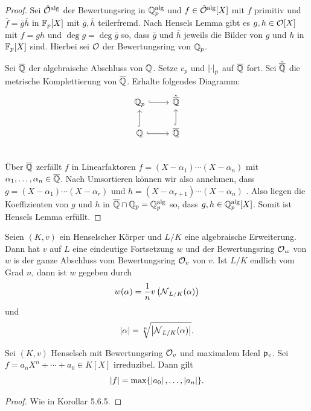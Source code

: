 \begin{proof}
	Sei $\hat{\mathcal{O}}^{\operatorname{alg}}$ der Bewertungsring in $\mathbb{Q}_p^{\operatorname{alg}}$ und $f\in\hat{\mathcal{O}}^{\operatorname{alg}}[X]$
	mit $f$ primitiv und $\overline{f} = \overline{g} \overline{h}$ in $\mathbb{F}_p[X]$ mit $\overline{g}, \overline{h}$ teilerfremd.
	Nach Hensels Lemma gibt es $g,h \in \mathcal{O}[X]$ mit $f=gh$ und $\deg g = \deg \overline{g}$ so, dass $\overline{g}$ und $\overline{h}$ jeweils die Bilder von $g$ und $h$ in $\mathbb{F}_p[X]$ sind. Hierbei sei $\mathcal{O}$ der Bewertungsring von $\mathbb{Q}_p$.
	
	\bigskip Sei $\overline{\mathbb{Q}}$ der algebraische Abschluss von $\mathbb{Q}$. Setze $v_p$ und $\left|{\cdot}\right|_p$ auf $\overline{\mathbb{Q}}$ fort. Sei $\hat{\overline{\mathbb{Q}}}$ die metrische Komplettierung von $\overline{\mathbb{Q}}$. Erhalte folgendes Diagramm:
	\[ \begin{tikzcd}
	\Q_p
	\arrow[hookrightarrow]{r}
	& \hat{\overline{\Q}}
	\\
	\Q
	\arrow[hookrightarrow]{r}
	\arrow[hookrightarrow]{u}
	&\overline{\Q}
	\arrow[hookrightarrow]{u}
	\\
	\end{tikzcd}
	\]
Über $\overline{\mathbb{Q}}$ zerfällt $f$ in Linearfaktoren $f=(X-\alpha_1) \cdots (X-\alpha_n)$ mit $\alpha_1, \dots, \alpha_n \in\overline{\mathbb{Q}}$. Nach Umsortieren können wir also annehmen, dass
$g=(X-\alpha_1) \cdots (X-\alpha_r)$ und $h=(X-\alpha_{r+1}) \cdots (X-\alpha_n)$ . Also liegen die Koeffizienten von $g$ und $h$ in $\overline{\mathbb{Q}} \cap \mathbb{Q}_p = \mathbb{Q}_p^{\operatorname{alg}}$ so, dass $g,h \in \mathbb{Q}_p^{\operatorname{alg}}[X]$. Somit ist Hensels Lemma erfüllt.
\end{proof}

\begin{Prop}
	Seien $(K,v)$ ein Henselscher Körper und $L/K$ eine algebraische Erweiterung. Dann hat $v$ auf $L$ eine eindeutige Fortsetzung $w$ und der Bewertungsring $\mathcal{O}_w$ von $w$ is der ganze Abschluss vom Bewertungsring $\mathcal{O}_v$ von $v$. Ist $L/K$ endlich vom Grad $n$, dann ist $w$ gegeben durch
	\[ w(\alpha) = \frac{1}{n} v \left( \operatorname{\mathcal{N}}_{L/K} ( \alpha) \right)
	\]
	und
	\[ \left|{\alpha}\right| = \sqrt[n]{\left|{\operatorname{\mathcal{N}}_{L/K}(\alpha)}\right|}.
	\]
\end{Prop}


\begin{Bem}
	Sei $(K,v)$ Henselsch mit Bewertungsring $\mathcal{O}_v$ und maximalem Ideal $\mathfrak{p}_v$.
	Sei $f= a_nX^n + \cdots + a_0 \in K[X]$ irreduzibel. Dann gilt
	\[ \left|{f}\right| =\max \{  \left|{a_0}\right|, \dots, \left|{a_n}\right| \}.
	\]
\end{Bem}

\begin{proof}
	Wie in Korollar 5.6.5.
\end{proof}

